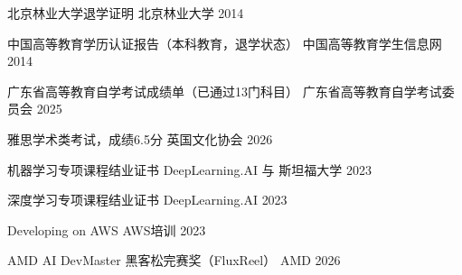 

\begin{cvhonors}

  \cvhonor
    {北京林业大学退学证明} %
    {北京林业大学} %
    {} %
    {2014} %

  \cvhonor
    {中国高等教育学历认证报告（本科教育，退学状态）} %
    {中国高等教育学生信息网} %
    {} %
    {2014} %

  \cvhonor
    {广东省高等教育自学考试成绩单（已通过13门科目）} %
    {广东省高等教育自学考试委员会} %
    {} %
    {2025} %

  \cvhonor
    {雅思学术类考试，成绩6.5分} %
    {英国文化协会} %
    {} %
    {2026} %

  \cvhonor
    {机器学习专项课程结业证书} %
    {DeepLearning.AI 与 斯坦福大学} %
    {} %
    {2023} %

  \cvhonor
    {深度学习专项课程结业证书} %
    {DeepLearning.AI} %
    {} %
    {2023} %

  \cvhonor
    {Developing on AWS} %
    {AWS培训} %
    {} %
    {2023} %

  \cvhonor
    {AMD AI DevMaster 黑客松完赛奖（FluxReel）} %
    {AMD} %
    {} %
    {2026} %

\end{cvhonors}
